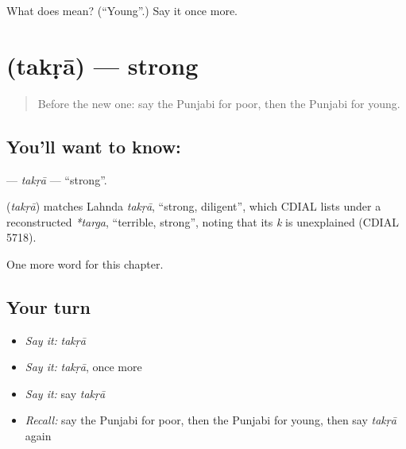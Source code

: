 \begin{tcolorbox}[breakable,colback=teal!4,colframe=teal!35!black,title={Before you move on}]
What does  mean? (\textquotedblleft{}Young\textquotedblright{}.) Say it once more.
\end{tcolorbox}
\section[\texorpdfstring{\pa{ਤਕੜਾ} (takṛā)}{ਤਕੜਾ (takṛā)}]{ (takṛā) — strong}

\label{lesson:PA-C147-takra}



\begin{quote}
Before the new one: say the Punjabi for poor, then the Punjabi for young.
\end{quote}

\subsection*{You'll want to know: }
\textbf{} — \emph{takṛā} — \textquotedblleft{}strong\textquotedblright{}.

\begin{cousinweb}
\textbf{} (\emph{takṛā}) matches Lahnda \emph{takṛā}, \textquotedblleft{}strong, diligent\textquotedblright{}, which CDIAL lists under a reconstructed \emph{*targa}, \textquotedblleft{}terrible, strong\textquotedblright{}, noting that its \emph{k} is unexplained (CDIAL 5718).
\end{cousinweb}

\begin{grammarlens}[title={What you've built}]
One more word for this chapter.
\end{grammarlens}

\subsection*{Your turn}
\begin{itemize}
\raggedright
  \item \emph{Say it:} \emph{takṛā}
  \item \emph{Say it:} \emph{takṛā}, once more
  \item \emph{Say it:} say \emph{takṛā}
  \item \emph{Recall:} say the Punjabi for poor, then the Punjabi for young, then say \emph{takṛā} again
\end{itemize}


